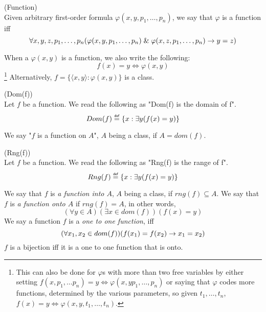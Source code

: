 \begin{definition}{(Function)}\label{def:function}\\
Given arbitrary first-order formula $\varphi(x, y, p_1, \ldots, p_n)$, we say that $\varphi$ is a function iff
\begin{equation}\label{def:function_formula}
\forall x, y, z, p_1, \ldots, p_n (\varphi(x, y, p_1, \ldots, p_n) \mathrel{\&} \varphi(x, z, p_1, \ldots, p_n) \rightarrow y = z)
\end{equation}
\end{definition}
When a $\varphi(x, y)$ is a function, we also write the following:
\begin{equation}
f(x) = y \iff \varphi(x, y)
\end{equation}
\footnote{This can also be done for $\varphi$s with more than two free variables by either setting $f(x, p_1, \ldots p_n) = y \iff \varphi(x, y p_1, \ldots, p_n)$ or saying that $\varphi$ codes more functions, determined by the various parameters, so given $t_1, \ldots, t_n$, $f(x) = y \iff \varphi(x, y, t_1, \ldots, t_n)$.}
Alternatively, $f = \{\langle x, y \rangle : \varphi(x, y)\}$ is a class.


\begin{definition}{(Dom(f))}\label{def:dom}\\
Let $f$ be a function. We read the following as "Dom(f) is the domain of f".
\begin{equation}
Dom(f) \defeq \{x : \exists y (f(x) = y)\}
\end{equation}
\end{definition}
We say "$f$ is a function on $A$", $A$ being a class, if $A = dom(f)$.

\begin{definition}{(Rng(f))}\label{def:rng}\\
Let $f$ be a function. We read the following as "Rng(f) is the range of f".
\begin{equation}
Rng(f) \defeq \{x : \exists y (f(x) = y)\}
\end{equation}
\end{definition}
We say that $f$ is \emph{a function into $A$}, $A$ being a class, if $rng(f) \subseteq A$.
We say that $f$ is \emph{a function onto $A$} if $rng(f) = A$, in other words,
\begin{equation}
(\forall y \in A)(\exists x \in dom(f))(f(x) = y)
\end{equation}
We say a function $f$ is a \emph{one to one function}, iff
\begin{equation}
(\forall x_1, x_2 \in dom(f))(f(x_1) = f(x_2) \rightarrow x_1 = x_2)
\end{equation}
$f$ is a bijection iff it is a one to one function that is onto.

